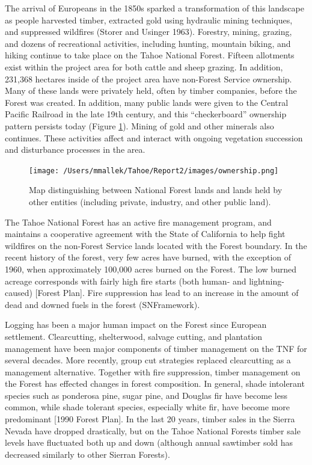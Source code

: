 The arrival of Europeans in the 1850s sparked a transformation of this landscape as people harvested timber, extracted gold using hydraulic mining techniques, and suppressed wildfires (Storer and Usinger 1963). Forestry, mining, grazing, and dozens of recreational activities, including hunting, mountain biking, and hiking continue to take place on the Tahoe National Forest. Fifteen allotments exist within the project area for both cattle and sheep grazing. In addition, 231,368 hectares inside of the project area have non-Forest Service ownership. Many of these lands were privately held, often by timber companies, before the Forest was created. In addition, many public lands were given to the Central Pacific Railroad in the late 19th century, and this ``checkerboard'' ownership pattern persists today (Figure \ref{ownership}). Mining of gold and other minerals also continues. These activities affect and interact with ongoing vegetation succession and disturbance processes in the area. 

\begin{figure}[!htbp]
\centering
\texttt{[image: /Users/mmallek/Tahoe/Report2/images/ownership.png]}
\caption{Map distinguishing between National Forest lands and lands held by other entities (including private, industry, and other public land).} 
\label{ownership}
\end{figure}

The Tahoe National Forest has an active fire management program, and maintains a cooperative agreement with the State of California to help fight wildfires on the non-Forest Service lands located with the Forest boundary. In the recent history of the forest, very few acres have burned, with the exception of 1960, when approximately 100,000 acres burned on the Forest. The low burned acreage corresponds with fairly high fire starts (both human- and lightning-caused) [Forest Plan]. Fire suppression has lead to an increase in the amount of dead and downed fuels in the forest (SNFramework).

Logging has been a major human impact on the Forest since European settlement. Clearcutting, shelterwood, salvage cutting, and plantation management have been major components of timber management on the TNF for several decades. More recently, group cut strategies replaced clearcutting as a management alternative. Together with fire suppression, timber management on the Forest has effected changes in forest composition. In general, shade intolerant species such as ponderosa pine, sugar pine, and Douglas fir have become less common, while shade tolerant species, especially white fir, have become more predominant [1990 Forest Plan]. In the last 20 years, timber sales in the Sierra Nevada have dropped drastically, but on the Tahoe National Forests timber sale levels have fluctuated both up and down (although annual sawtimber sold has decreased similarly to other Sierran Forests).



